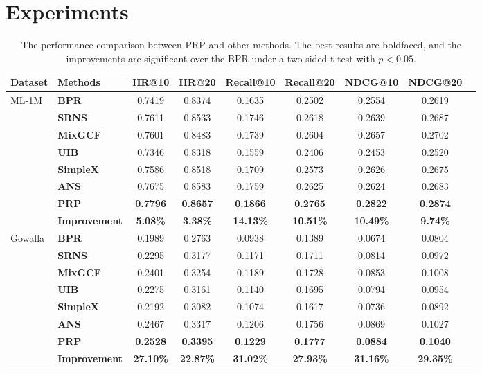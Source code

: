\section{Experiments}
\begin{table}[t]
\begin{center}
 \caption{The performance comparison between PRP and other methods. The best results are boldfaced, and the improvements are significant over the BPR under a two-sided t-test with $p<0.05$.}
\label{tab:Overall-comprehension}
\begin{tabular}{@{}llccccccc@{}}
\toprule
\textbf{Dataset} & \textbf{Methods} & HR@10 & HR@20 & Recall@10 & Recall@20 & NDCG@10 & NDCG@20  \\ \midrule
\multirow{8}{*}{ML-1M} 
  & \textbf{BPR} & 0.7419 & 0.8374 & 0.1635 & 0.2502 & 0.2554 &  0.2619 \\
  & \textbf{SRNS} & 0.7611 & 0.8533 & 0.1746 & 0.2618 & 0.2639 &  0.2687 \\
 & \textbf{MixGCF} & 0.7601 & 0.8483 & 0.1739 & 0.2604 & 0.2657 & 0.2702  \\
 & \textbf{UIB} & 0.7346 & 0.8318 & 0.1559 & 0.2406 & 0.2453 & 0.2520 \\ 
& \textbf{SimpleX} & 0.7586 & 0.8518 & 0.1709 & 0.2573 & 0.2626 & 0.2675  \\ 
& \textbf{ANS} & 0.7675 & 0.8583 & 0.1759 & 0.2625 & 0.2624 & 0.2683  \\
& \textbf{PRP} & \textbf{0.7796}& \textbf{0.8657} & \textbf{0.1866} & \textbf{0.2765} & \textbf{0.2822 }& \textbf{0.2874} \\ 
\cmidrule{2-8}
& \textbf{Improvement} & \textbf{5.08\%}& \textbf{3.38\%} & \textbf{14.13\%} & \textbf{10.51\%} & \textbf{10.49\%}& \textbf{9.74\%} \\ 

 \midrule
 
\multirow{8}{*}{Gowalla} 
  & \textbf{BPR} & 0.1989 & 0.2763 & 0.0938 & 0.1389 & 0.0674 &  0.0804 \\
  & \textbf{SRNS} & 0.2295 & 0.3177 & 0.1171 & 0.1711 & 0.0814 & 0.0972  \\ 
 & \textbf{MixGCF} & 0.2401 & 0.3254 & 0.1189 & 0.1728 & 0.0853 & 0.1008  \\
 & \textbf{UIB} & 0.2275 & 0.3161 & 0.1140 & 0.1695 & 0.0794 & 0.0954 \\ 
& \textbf{SimpleX} & 0.2192 & 0.3082 & 0.1074 & 0.1617 & 0.0736 & 0.0892  \\
& \textbf{ANS} & 0.2467 & 0.3317 & 0.1206 & 0.1756 & 0.0869 & 0.1027  \\ 
& \textbf{PRP} & \textbf{0.2528} & \textbf{0.3395} & \textbf{0.1229} & \textbf{0.1777} & \textbf{0.0884} &\textbf{0.1040}  \\ 
\cmidrule{2-8}
& \textbf{Improvement} & \textbf{27.10\%}& \textbf{22.87\%} & \textbf{31.02\%} & \textbf{27.93\%} & \textbf{31.16\% }& \textbf{29.35\%} \\ 


\end{tabular}
\end{center}
\end{table}
